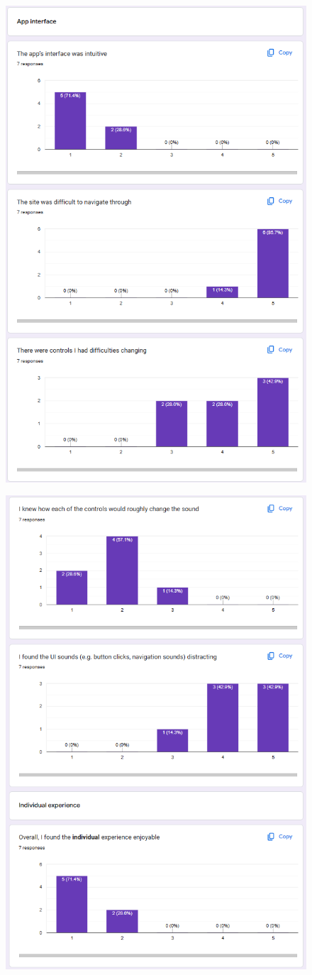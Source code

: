 \begin{appendices}
\begin{figure}[htb]
    \includegraphics[width=0.8\linewidth]{images/survey-results/4.png}    
\end{figure}
\begin{figure}[htb]
    \centering
    \includegraphics[width=0.8\linewidth]{images/survey-results/5.png}    

\end{figure}
\end{appendices}
